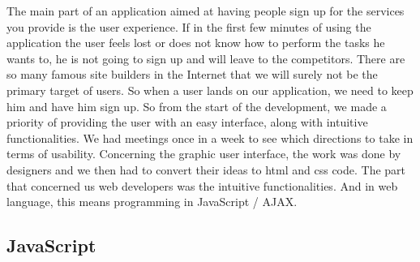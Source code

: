 The main part of an application aimed at having people sign up for the services you provide is the user experience. If in the first few minutes of using the application the user feels lost or does not know how to perform the tasks he wants to, he is not going to sign up and will leave to the competitors. There are so many famous site builders in the Internet that we will surely not be the primary target of users. So when a user lands on our application, we need to keep him and have him sign up. So from the start of the development, we made a priority of providing the user with an easy interface, along with intuitive functionalities.
We had meetings once in a week to see which directions to take in terms of usability. Concerning the graphic user interface, the work was done by designers and we then had to convert their ideas to html and css code. The part that concerned us web developers was the intuitive functionalities. And in web language, this means programming in JavaScript / AJAX.

\subsection{JavaScript}

